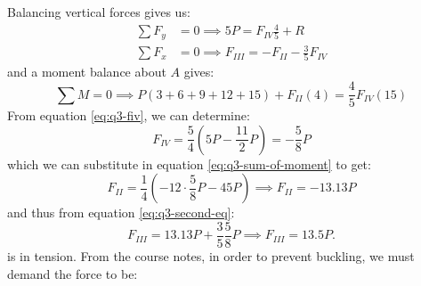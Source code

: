 \documentclass{article}
\begin{document}
\begin{center}
\end{center}
Balancing vertical forces gives us:
\begin{align}
    \sum F_y &= 0 \implies 5P=F_{IV}\frac{4}{5}+R \label{eq:q3-fiv} \\
    \sum F_x &= 0 \implies F_{III} = -F_{II} - \frac{3}{5}F_{IV}
    \label{eq:q3-second-eq}
\end{align}
and a moment balance about $A$ gives:
\begin{equation}
    \sum M = 0 \implies P(3+6+9+12+15)+F_{II}(4)=\frac{4}{5}F_{IV}(15)
    \label{eq:q3-sum-of-moment}
\end{equation}
From equation \ref{eq:q3-fiv}, we can determine:
\begin{equation}
    F_{IV} = \frac{5}{4}\left(5P-\frac{11}{2}P\right) = - \frac{5}{8}P
    \label{eq:}
\end{equation}
which we can substitute in equation \ref{eq:q3-sum-of-moment} to get:
\begin{equation}
    F_{II}=\frac{1}{4}\left(-12\cdot \frac{5}{8}P - 45P\right) \implies \boxed{F_{II}=-13.13P}
    \label{eq:}
\end{equation}
and thus from equation \ref{eq:q3-second-eq}:
\begin{equation}
    F_{III} = 13.13P+\frac{3}{5}\frac{5}{8}P\implies \boxed{F_{III}=13.5P}.
    \label{eq:}
\end{equation}
is in tension. From the course notes, in order to prevent buckling, we must demand the force to be:
\end{document}
